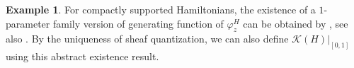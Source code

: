 \documentclass[11pt]{amsart}
\numberwithin{equation}{section}
\theoremstyle{plain}
\theoremstyle{definition}
\newtheorem{eg}[Eg]{Example}
\theoremstyle{remark}
\newcommand{\cK} { {\mathcal{K}}}
\begin{document}
\begin{eg}For compactly supported Hamiltonians, the existence of a $1$-parameter family version of generating function of $\varphi^H_z$ can be obtained by \cite{Sikorav1987}, see also \cite[Lemma 2.2-(i)]{large_non_equeezing_GF}. By the uniqueness of sheaf quantization, we can also define $\cK(H)|_{[0,1]}$ using this abstract existence result. 
\end{eg}







 










\clearpage
{}

\end{document}
